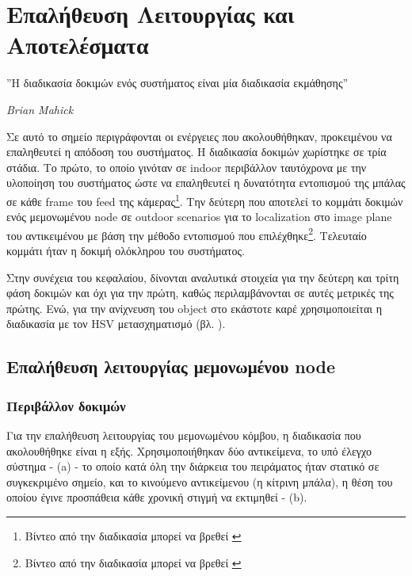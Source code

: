 \chapter{Επαλήθευση Λειτουργίας και Αποτελέσματα} %
\label{chap:Chapter6}

\epigraph{”Η διαδικασία δοκιμών ενός συστήματος είναι μία διαδικασία εκμάθησης''}{\textit{Brian Mahick}}

Σε αυτό το σημείο περιγράφονται οι ενέργειες που ακολουθήθηκαν, προκειμένου να επαληθευτεί η απόδοση του συστήματος.
Η διαδικασία δοκιμών χωρίστηκε σε τρία στάδια. Το πρώτο, το οποίο γινόταν σε indoor περιβάλλον ταυτόχρονα με την υλοποίηση του συστήματος
ώστε να επαληθευτεί η δυνατότητα εντοπισμού της μπάλας σε κάθε frame του feed της κάμερας\footnote{Βίντεο από την διαδικασία μπορεί να βρεθεί \cite{experiment-1-video}}. Την δεύτερη
που αποτελεί το κομμάτι δοκιμών ενός μεμονωμένου node σε outdoor scenarios για το localization στο image plane του αντικειμένου με βάση την μέθοδο εντοπισμού που επιλέχθηκε\footnote{
Βίντεο από την διαδικασία μπορεί να βρεθεί \cite{experiment-2-video}}. Τελευταίο κομμάτι ήταν η δοκιμή ολόκληρου του συστήματος.

Στην συνέχεια του κεφαλαίου, δίνονται αναλυτικά στοιχεία για την δεύτερη και τρίτη φάση δοκιμών και όχι για την πρώτη, καθώς περιλαμβάνονται σε αυτές μετρικές της πρώτης. Ενώ, για την ανίχνευση του object στο εκάστοτε καρέ χρησιμοποιείται η διαδικασία με τον HSV μετασχηματισμό (βλ. ).

\section{Επαλήθευση λειτουργίας μεμονωμένου node}

\subsection{Περιβάλλον δοκιμών}
Για την επαλήθευση λειτουργίας του μεμονωμένου κόμβου, η διαδικασία που ακολουθήθηκε είναι η εξής. 
Χρησιμοποιήθηκαν δύο αντικείμενα, το υπό έλεγχο σύστημα -  (a) - το οποίο κατά όλη την διάρκεια του πειράματος ήταν στατικό σε συγκεκριμένο σημείο, και το κινούμενο αντικείμενου (η κίτρινη μπάλα), η θέση του οποίου έγινε προσπάθεια κάθε χρονική στιγμή να εκτιμηθεί -  (b).   

